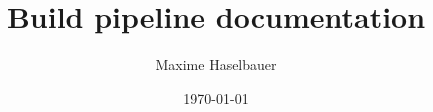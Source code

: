 \documentclass[a4paper,10pt]{article}
\title{Build pipeline documentation}
\author{Maxime Haselbauer}
\date{\today}
\begin{document}
\maketitle

\printnomenclature
\printglossaries



\printbibliography
\end{document}
